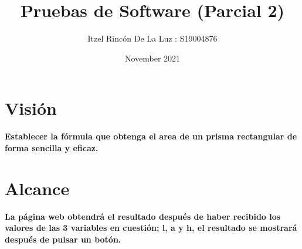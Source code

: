 \documentclass{article}
\title{Pruebas de Software (Parcial 2)}
\author{Itzel Rincón De La Luz : S19004876}
\date{November 2021}
\begin{document}
\maketitle

\section{Visión}

\textbf{Establecer la fórmula que obtenga el area de un prisma rectangular de forma sencilla y eficaz.}
\section{Alcance}
\textbf{La página web obtendrá el resultado después de haber recibido los valores de las 3 variables en cuestión; l, a y h, el resultado se mostrará después de pulsar un botón.}
\end{document}
